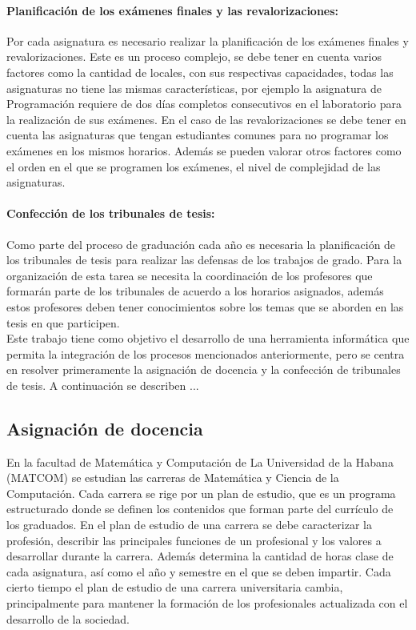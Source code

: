 \paragraph{Planificación de los exámenes finales y las revalorizaciones:}
Por cada asignatura es necesario realizar la planificación de los exámenes
finales y revalorizaciones. Este es un proceso complejo, se debe tener en cuenta 
varios factores como la cantidad de locales, con sus respectivas capacidades,
todas las asignaturas no tiene las mismas características, por ejemplo la asignatura de 
Programación requiere de dos días completos consecutivos en el laboratorio para 
la realización de sus exámenes. En el caso de las revalorizaciones
se debe tener en cuenta las asignaturas que tengan estudiantes comunes para no programar los 
exámenes en los mismos horarios. Además se pueden valorar otros factores como el orden en el que 
se programen los exámenes, el nivel de complejidad de las asignaturas.

\paragraph{Confección de los tribunales de tesis:}
Como parte del proceso de graduación cada año 
es necesaria la planificación de los tribunales de tesis para 
realizar las defensas de los trabajos de grado. Para la organización 
de esta tarea se necesita la coordinación de los profesores que formarán parte 
de los tribunales de acuerdo a los horarios asignados, además estos profesores 
deben tener conocimientos sobre los temas que se aborden en las tesis en que participen. \\


Este trabajo tiene como objetivo el desarrollo de una herramienta informática que permita
la integración de los procesos mencionados anteriormente, pero se centra en resolver
primeramente la asignación de docencia y  la confección de tribunales
de tesis. A continuación se describen ...


\subsection{Asignación de docencia}

En la facultad de Matemática y Computación de La Universidad de la 
Habana (MATCOM) se estudian las carreras de Matemática y Ciencia de la Computación. 
Cada carrera se rige por un plan de estudio, que es un programa estructurado
donde se definen los contenidos que forman parte del currículo de los 
graduados. En el plan de estudio de una carrera 
se debe caracterizar la profesión, describir las principales funciones de un profesional y 
los valores a desarrollar durante la carrera. 
Además determina la cantidad de horas clase de cada asignatura,
así como el año y semestre en el que se deben impartir.
Cada cierto tiempo el plan de estudio de una carrera universitaria cambia, principalmente
para mantener la formación de los profesionales actualizada con el desarrollo de la 
sociedad.

